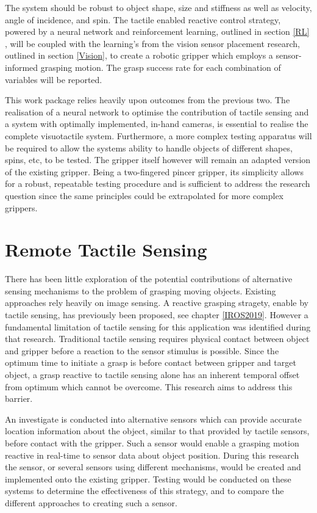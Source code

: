 The system should be robust to object shape, size and stiffness as well as velocity, angle of incidence, and spin. The tactile enabled reactive control strategy, powered by a neural network and reinforcement learning, outlined in section \ref{RL} , will be coupled with the learning's from the vision sensor placement research, outlined in section \ref{Vision}, to create a robotic gripper which employs a sensor-informed grasping motion. The grasp success rate for each combination of variables will be reported.

This work package relies heavily upon outcomes from the previous two. The realisation of a neural network to optimise the contribution of tactile sensing and a system with optimally implemented, in-hand cameras, is essential to realise the complete visuotactile system. Furthermore, a more complex testing apparatus will be required to allow the systems ability to handle objects of different shapes, spins, etc, to be tested. The gripper itself however will remain an adapted version of the existing gripper. Being a two-fingered pincer gripper, its simplicity allows for a robust, repeatable testing procedure and is sufficient to address the research question since the same principles could be extrapolated for more complex grippers.


\section{Remote Tactile Sensing}

There has been little exploration of the potential contributions of alternative sensing mechanisms to the problem of grasping moving objects. Existing approaches rely heavily on image sensing. A reactive grasping stragety, enable by tactile sensing, has previously been proposed, see chapter \ref{IROS2019}. However a fundamental limitation of tactile sensing for this application was identified during that research. Traditional tactile sensing requires physical contact between object and gripper before a reaction to the sensor stimulus is possible. Since the optimum time to initiate a grasp is before contact between gripper and target object, a grasp reactive to tactile sensing alone has an inherent temporal offset from optimum which cannot be overcome. This research aims to address this barrier.

An investigate is conducted into alternative sensors which can provide accurate location information about the object, similar to that provided by tactile sensors, before contact with the gripper. Such a sensor would enable a grasping motion reactive in real-time to sensor data about object position. During this research the sensor, or several sensors using different mechanisms, would be created and implemented onto the existing gripper. Testing would be conducted on these systems to determine the effectiveness of this strategy, and to compare the different approaches to creating such a sensor.

